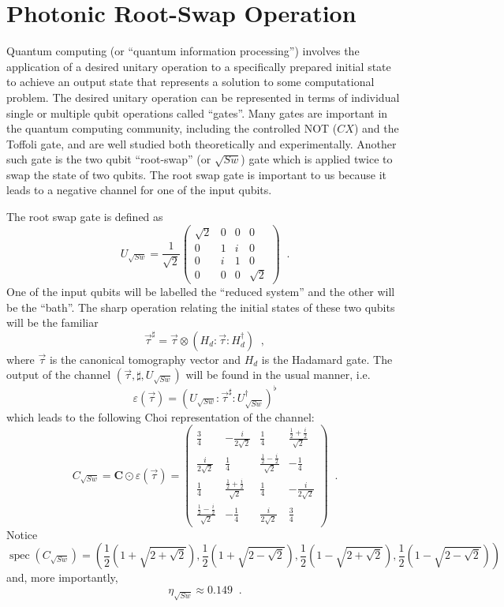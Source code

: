\section{Photonic Root-Swap Operation}

Quantum computing (or ``quantum information processing'') involves the application of a desired unitary operation to a specifically prepared initial state to achieve an output state that represents a solution to some computational problem.  The desired unitary operation can be represented in terms of individual single or multiple qubit operations called ``gates''.  Many gates are important in the quantum computing community, including the controlled NOT ($CX$) and the Toffoli gate, and are well studied both theoretically and experimentally.  Another such gate is the two qubit ``root-swap'' (or $\sqrt{Sw}$) gate which is applied twice to swap the state of two qubits.  The root swap gate is important to us because it leads to a negative channel for one of the input qubits.

The root swap gate is defined as
$$
U_{\sqrt{Sw}} = \frac{1}{\sqrt{2}}\begin{pmatrix}
\sqrt{2}&0&0&0\\
0&1&i&0\\
0&i&1&0\\
0&0&0&\sqrt{2}
\end{pmatrix}\;\;.
$$
One of the input qubits will be labelled the ``reduced system'' and the other will be the ``bath''.  The sharp operation relating the initial states of these two qubits will be the familiar 
$$
\vec{\tau}^\sharp = \vec{\tau}\otimes\left(H_d:\vec{\tau}:H_d^\dagger\right)\;\;,
$$
where $\vec{\tau}$ is the canonical tomography vector and $H_d$ is the Hadamard gate.  The output of the channel $(\vec{\tau},\sharp,U_{\sqrt{Sw}})$ will be found in the usual manner, i.e.\
$$
\varepsilon(\vec{\tau}) = \left(U_{\sqrt{Sw}}:\vec{\tau}^\sharp:U_{\sqrt{Sw}}^\dagger\right)^\flat
$$
which leads to the following Choi representation of the channel:
$$
C_{\sqrt{Sw}} = \mathbf{C}\odot\varepsilon\left(\vec{\tau}\right) =
\begin{pmatrix}
 \frac{3}{4} & -\frac{i}{2 \sqrt{2}} & \frac{1}{4} & \frac{\frac{1}{2}+\frac{i}{2}}{\sqrt{2}} \\
 \frac{i}{2 \sqrt{2}} & \frac{1}{4} & \frac{\frac{1}{2}-\frac{i}{2}}{\sqrt{2}} & -\frac{1}{4} \\
 \frac{1}{4} & \frac{\frac{1}{2}+\frac{i}{2}}{\sqrt{2}} & \frac{1}{4} & -\frac{i}{2 \sqrt{2}} \\
 \frac{\frac{1}{2}-\frac{i}{2}}{\sqrt{2}} & -\frac{1}{4} & \frac{i}{2 \sqrt{2}} & \frac{3}{4}
\end{pmatrix}\;\;.
$$
Notice
$$
\operatorname{spec}(C_{\sqrt{Sw}}) = \left(\frac{1}{2} \left(1+\sqrt{2+\sqrt{2}}\right),\frac{1}{2} \left(1+\sqrt{2-\sqrt{2}}\right),\frac{1}{2} \left(1-\sqrt{2+\sqrt{2}}\right),\frac{1}{2} \left(1-\sqrt{2-\sqrt{2}}\right)\right)
$$
and, more importantly,
$$
\eta_{\sqrt{Sw}} \approx 0.149\;\;.
$$


